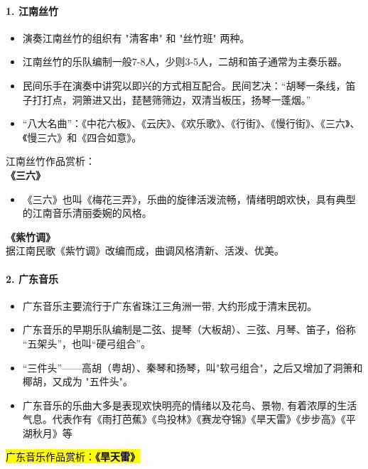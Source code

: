 \documentclass[
]{article}
\providecommand{\tightlist}{%
  \setlength{\itemsep}{0pt}\setlength{\parskip}{0pt}}
\begin{document}
\paragraph{1. 江南丝竹}\label{ux6c5fux5357ux4e1dux7af9}

\begin{itemize}
\tightlist
\item
  演奏江南丝竹的组织有 "清客串" 和 "丝竹班" 两种。
\item
  江南丝竹的乐队编制一般7-8人，少则3-5人，二胡和笛子通常为主奏乐器。
\item
  民间乐手在演奏中讲究以即兴的方式相互配合。民间艺决：``胡琴一条线，笛子打打点，洞箫进又出，琵琶筛筛边，双清当板压，扬琴一蓬烟。''
\item
  ``八大名曲''：《中花六板》、《云庆》、《欢乐歌》、《行街》、《慢行街》、《三六》、《慢三六》和《四合如意》。
\end{itemize}

江南丝竹作品赏析：\\
\textbf{《三六》}

\begin{itemize}
\tightlist
\item
  《三六》也叫《梅花三弄》，乐曲的旋律活泼流畅，情绪明朗欢快，具有典型的江南音乐清丽委婉的风格。
\end{itemize}

\textbf{《紫竹调》}\\
据江南民歌《紫竹调》改编而成，曲调风格清新、活泼、优美。

\paragraph{2. 广东音乐}\label{ux5e7fux4e1cux97f3ux4e50}

\begin{itemize}
\tightlist
\item
  广东音乐主要流行于广东省珠江三角洲一带, 大约形成于清末民初。
\item
  广东音乐的早期乐队编制是二弦、提琴（大板胡）、三弦、月琴、笛子，俗称
  ``五架头''，也叫``硬弓组合''。
\item
  ``三件头''------高胡（粤胡）、秦琴和扬琴，叫"软弓组合"，之后又增加了洞箫和椰胡，又成为
  "五件头"。
\item
  广东音乐的乐曲大多是表现欢快明亮的情绪以及花鸟、景物,
  有着浓厚的生活气息。代表作有《雨打芭蕉》《鸟投林》《赛龙夺锦》《旱天雷》《步步高》《平湖秋月》等
\end{itemize}

\hl{\mbox{广东音乐作品赏析：\textbf{《旱天雷》}}}
\end{document}
